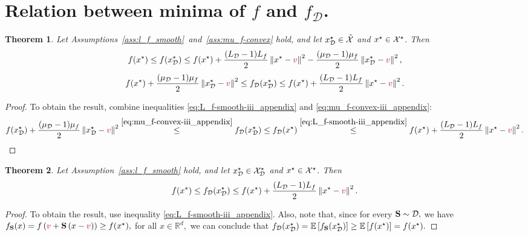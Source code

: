\documentclass{article}
\newcommand{\cX}{{\cal X}}
\newcommand{\shift}{{\color{purple}s}}
\newcommand{\bb}{\mathbb}
\newcommand{\norm}[1]{\left\| #1 \right\|}
\newcommand{\cD}{\mathcal{D}}
\newcommand{\Exp}[1]{{\bb E}\left[#1\right]}
\newtheorem{theorem}{Theorem}
\theoremstyle{plain}
\newcommand{\tf}{f_{\mathcal{D}}}
\renewcommand{\shift}{{\color{purple}v}}
\newcommand{\mS}{{\bf S}}
\theoremstyle{plain}
\theoremstyle{definition}
\theoremstyle{remark}
\begin{document}
\section{Relation between minima of $f$ and $\tf$.}
\begin{theorem} \label{thm:approx_appendix} Let Assumptions~\ref{ass:l_f_smooth}~and~\ref{ass:mu_f-convex} hold, and let $x_\cD^\star\in \tilde{\cX}$ and $x^\star \in \cX^\star$. Then
\begin{equation*}
    f(x^\star) \leq f(x_\cD^\star) \leq f(x^\star)  + \frac{(L_{\mathcal{D}}-1)L_f}{2}\norm{x^\star-\shift}^2 - \frac{(\mu_{\mathcal{D}}-1)\mu_f}{2}\norm{x_\cD^\star-\shift}^2,
\end{equation*}
\begin{equation*}
    f(x^\star) + \frac{(\mu_{\mathcal{D}}-1)\mu_f}{2}\norm{x_\cD^\star-\shift}^2 \leq \tf(x_\cD^\star) \leq f(x^\star)  + \frac{(L_{\mathcal{D}}-1)L_f}{2}\norm{x^\star-\shift}^2.
\end{equation*}
\end{theorem}
\begin{proof} To obtain the result, combine inequalities \eqref{eq:L_f-smooth-iii_appendix} and \eqref{eq:mu_f-convex-iii_appendix}:
\begin{equation*}
\begin{split}
    f(x_\cD^\star) + \frac{(\mu_{\mathcal{D}}-1)\mu_f}{2}\norm{x_\cD^\star-\shift}^2 \overset{\eqref{eq:mu_f-convex-iii_appendix}}{\leq}   \tf(x_\cD^\star) \leq \tf(x^\star)  \overset{\eqref{eq:L_f-smooth-iii_appendix}}{\leq}   f(x^\star) + \frac{(L_{\mathcal{D}}-1)L_f}{2}\norm{x^\star-\shift}^2.
\end{split}
\end{equation*}
\end{proof}

\begin{theorem}\label{thm:approx_noncvx_appendix}
     Let Assumption~\ref{ass:l_f_smooth} hold, and let $x_\cD^\star\in \cX^\star_{\cD}$ and $x^\star \in \cX^\star$. Then
\begin{equation*}
    f(x^\star) \leq \tf(x_\cD^\star) \leq f(x^\star)  + \frac{(L_{\mathcal{D}}-1)L_f}{2}\norm{x^\star-\shift}^2.
\end{equation*}
\end{theorem}
\begin{proof}
    To obtain the result, use inequality \eqref{eq:L_f-smooth-iii_appendix}. Also, note that, since for every $\mS\sim \mathcal{D},$ we have $f_{\mS}(x) = f\left(\shift + \mS\left(x-\shift\right)\right)\geq f(x^\star),$ for all $x\in\mathbb{R}^d,$ we can conclude that $\tf(x_\cD^\star) = \Exp{f_{\mS}(x_\cD^\star)}\geq \Exp{f(x^\star)}= f(x^{\star}).$
\end{proof}
\end{document}
